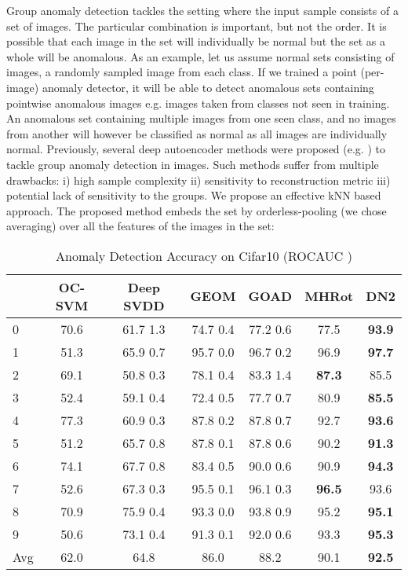\documentclass{article}
\begin{document}
Group anomaly detection tackles the setting where the input sample consists of a set of images. The particular combination is important, but not the order. It is possible that each image in the set will individually be normal but the set as a whole will be anomalous. As an example, let us assume normal sets consisting of  images, a randomly sampled image from each class. If we trained a point (per-image) anomaly detector, it will be able to detect anomalous sets containing pointwise anomalous images e.g. images taken from classes not seen in training. An anomalous set containing multiple images from one seen class, and no images from another will however be classified as normal as all images are individually normal. Previously, several deep autoencoder methods were proposed (e.g. \citet{dgroup}) to tackle group anomaly detection in images. Such methods suffer from multiple drawbacks: i) high sample complexity ii) sensitivity to reconstruction metric iii) potential lack of sensitivity to the groups. We propose an effective kNN based approach. The proposed method embeds the set by orderless-pooling (we chose averaging) over all the features of the images in the set: 
\begin{table*}[ht]
  \centering
  \caption{Anomaly Detection Accuracy on Cifar10 (ROCAUC )}
  \label{tab:exp_cifar10}

    \begin{tabular}{lcccccc}
    \toprule      

   & OC-SVM & Deep SVDD & GEOM & GOAD & MHRot & DN2 \\
    \midrule
   0 & 70.6 & 61.7  1.3 & 74.7  0.4 & 77.2  0.6 & 77.5& \textbf{93.9}\\
   1 & 51.3 & 65.9  0.7 & 95.7  0.0 & 96.7  0.2 & 96.9& \textbf{97.7}\\
   2 & 69.1 & 50.8  0.3 & 78.1  0.4 & 83.3  1.4 & \textbf{87.3}& 85.5\\
   3 & 52.4 & 59.1  0.4 & 72.4  0.5 & 77.7  0.7 & 80.9& \textbf{85.5}\\
   4 & 77.3 & 60.9  0.3 & 87.8  0.2 & 87.8  0.7 & 92.7& \textbf{93.6}\\
   5 & 51.2 & 65.7  0.8 & 87.8  0.1 & 87.8  0.6 & 90.2& \textbf{91.3}\\
   6 & 74.1 & 67.7  0.8 & 83.4  0.5 & 90.0  0.6 & 90.9& \textbf{94.3}\\
   7 & 52.6 & 67.3  0.3 & 95.5  0.1 & 96.1  0.3 & \textbf{96.5}& 93.6\\
   8 & 70.9 & 75.9  0.4 & 93.3  0.0 & 93.8  0.9 & 95.2& \textbf{95.1}\\
   9 & 50.6 & 73.1  0.4 & 91.3  0.1 & 92.0  0.6 & 93.3& \textbf{95.3}\\
   \midrule
   Avg & 62.0 & 64.8 & 86.0 & 88.2 & 90.1 & \textbf{92.5}\\
	 \bottomrule
    \end{tabular}
\end{table*}
\end{document}
